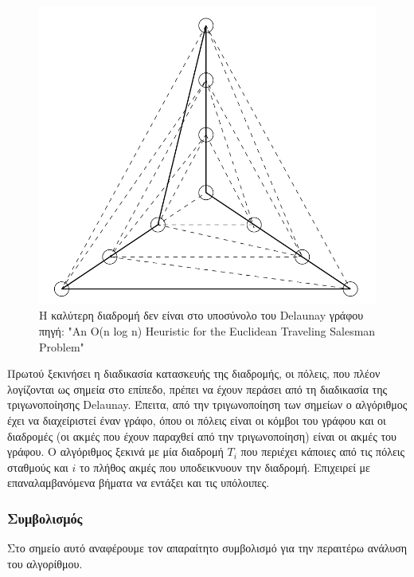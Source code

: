 \documentclass[oneside,12pt]{book}
\newenvironment{matlab}
	{\begin{figure}[hp]\centering\captionsetup{justification=centering}}
	{\end{figure}}
\theoremstyle{definition}
\begin{document}
\begin{matlab}
	\includegraphics[scale=0.5]{images/delaunay_optimum_tour.png}
	\caption{Η καλύτερη διαδρομή δεν είναι στο υποσύνολο του Delaunay γράφου \\ πηγή: "An O(n log n) Heuristic for the Euclidean Traveling Salesman Problem" \cite{10} }
\end{matlab}

Πρωτού ξεκινήσει η διαδικασία κατασκευής της διαδρομής, οι πόλεις, που πλέον λογίζονται ως σημεία στο επίπεδο, πρέπει να έχουν περάσει από τη διαδικασία της τριγωνοποίησης Delaunay. Έπειτα, από την τριγωνοποίηση των σημείων ο αλγόριθμος έχει να διαχείριστεί έναν γράφο, όπου οι πόλεις είναι οι κόμβοι του γράφου και οι διαδρομές (οι ακμές που έχουν παραχθεί από την τριγωνοποίηση) είναι οι ακμές του γράφου. Ο αλγόριθμος ξεκινά με μία διαδρομή \(T_i\) που περιέχει κάποιες από τις πόλεις σταθμούς και \(i\) το πλήθος ακμές που υποδεικνυουν την διαδρομή. Επιχειρεί με επαναλαμβανόμενα βήματα να εντάξει και τις υπόλοιπες. \\

\subsubsection{Συμβολισμός}

Στο σημείο αυτό αναφέρουμε τον απαραίτητο συμβολισμό για την περαιτέρω ανάλυση του αλγορίθμου. \\
\end{document}
